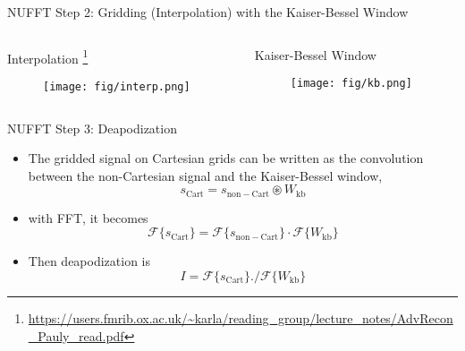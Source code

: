 \begin{frame}{NUFFT Step 2: Gridding (Interpolation) with the Kaiser-Bessel Window}

    \begin{columns}
	\begin{column}{0.65\textwidth}
		\centering
		Interpolation  \footnote{\url{https://users.fmrib.ox.ac.uk/~karla/reading_group/lecture_notes/AdvRecon_Pauly_read.pdf}}
		\begin{figure}
			\texttt{[image: fig/interp.png]}
		\end{figure}
	\end{column}

	\begin{column}{0.30\textwidth}
		\centering
		Kaiser-Bessel Window
		\begin{figure}
			\texttt{[image: fig/kb.png]}
		\end{figure}
	\end{column}
	\end{columns}

\end{frame}


\begin{frame}{NUFFT Step 3: Deapodization}

	\begin{itemize}
		\item The gridded signal on Cartesian grids can be written as the convolution between the non-Cartesian signal and the Kaiser-Bessel window,
		\begin{equation}
			s_\mathrm{Cart} = s_\mathrm{non-Cart} \circledast W_\mathrm{kb}
		\end{equation}

		\vspace{1em}

		\item with FFT, it becomes
		\begin{equation}
			\mathcal{F} \{s_\mathrm{Cart} \} = \mathcal{F} \{ s_\mathrm{non-Cart} \} \cdot \mathcal{F} \{ W_\mathrm{kb} \}
		\end{equation}

		\vspace{1em}

		\item Then deapodization is
		\begin{equation}
			I = \mathcal{F} \{s_\mathrm{Cart} \} ./ \mathcal{F} \{ W_\mathrm{kb} \}
		\end{equation}

	\end{itemize}

\end{frame}



